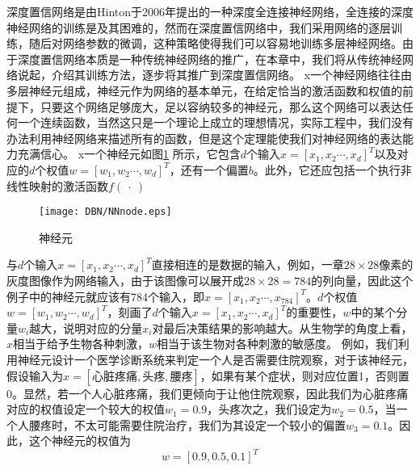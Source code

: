 \label{chapter:DBN}
深度置信网络是由Hinton于2006年提出的一种深度全连接神经网络，全连接的深度神经网络的训练是及其困难的，然而在深度置信网络中，我们采用网络的逐层训练，随后对网络参数的微调，这种策略使得我们可以容易地训练多层神经网络。由于深度置信网络本质是一种传统神经网络的推广，在本章中，我们将从传统神经网络说起，介绍其训练方法，逐步将其推广到深度置信网络。
x一个神经网络往往由多层神经元组成，神经元作为网络的基本单元，在给定恰当的激活函数和权值的前提下，只要这个网络足够庞大，足以容纳较多的神经元，那么这个网络可以表达任何一个连续函数，当然这只是一个理论上成立的理想情况，实际工程中，我们没有办法利用神经网络来描述所有的函数，但是这个定理能使我们对神经网络的表达能力充满信心。
x一个神经元如图\ref{img:NNnode_cp5} 所示，它包含$d$个输入$x = [x_1, x_2\cdots, x_d]^T$以及对应的$d$个权值$w = [w_1, w_2\cdots, w_d]^T$，还有一个偏置$b$。此外，它还应包括一个执行非线性映射的激活函数$f(~\cdot~)$
\begin{figure}[!htbp]
\centering
\texttt{[image: DBN/NNnode.eps]}
\caption{神经元}
\label{img:NNnode_cp5}
\end{figure}

与$d$个输入$x = [x_1, x_2\cdots, x_d]^T$直接相连的是数据的输入，例如，一章$28\times 28$像素的灰度图像作为网络输入，由于该图像可以展开成$28\times 28 = 784$的列向量，因此这个例子中的神经元就应该有784个输入，即$x = [x_1, x_2\cdots, x_{784}]^T$。$d$个权值$w = [w_1, w_2\cdots, w_d]^T$，刻画了$d$个输入$x = [x_1, x_2\cdots, x_d]^T$的重要性，$w$中的某个分量$w_i$越大，说明对应的分量$x_i$对最后决策结果的影响越大。从生物学的角度上看，$x$相当于给予生物各种刺激，$w$相当于该生物对各种刺激的敏感度。
例如，我们利用神经元设计一个医学诊断系统来判定一个人是否需要住院观察，对于该神经元，假设输入为$x = [\text{心脏疼痛},\text{头疼},\text{腰疼}]$，如果有某个症状，则对应位置1，否则置0。显然，若一个人心脏疼痛，我们更倾向于让他住院观察，因此我们为心脏疼痛对应的权值设定一个较大的权值$w_1 = 0.9$，头疼次之，我们设定为$w_2 = 0.5$，当一个人腰疼时，不太可能需要住院治疗，我们为其设定一个较小的偏置$w_3 = 0.1$。因此，这个神经元的权值为
\begin{equation}
w = [0.9, 0.5, 0.1]^T
\end{equation}

